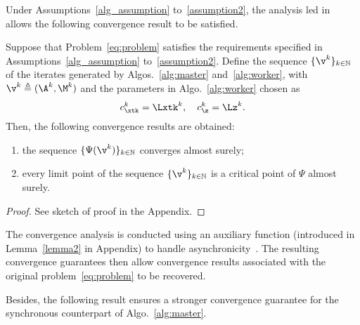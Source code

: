 \documentclass[journal,final,letterpaper,twoside,twocolumn]{IEEEtran}
\begin{document}
Under Assumptions~\ref{alg_assumption} to~\ref{assumption2}, the analysis led in~\cite{Cannelli2016} allows the following convergence result to be satisfied.

\begin{proposition} \label{prop_stochastic}
    Suppose that Problem~\eqref{eq:problem} satisfies the requirements specified in Assumptions~\ref{alg_assumption} to~\ref{assumption2}. Define the sequence $\{ \v^k \}_{k \in \mathbb{N}}$ of the iterates generated by Algos.~\ref{alg:master} and~\ref{alg:worker}, with $\v^k \triangleq (\A^k,\M^k)$ and the parameters in Algo.~\ref{alg:worker} chosen as
    \begin{equation*}
        c_{\xtk}^k = \Lxtk^k, \quad c_\z^k = \Lz^k.
    \end{equation*}
    Then, the following convergence results are obtained:
    \begin{enumerate}[label=(\roman*)]
        \item the sequence $\{ \Psi(\v^k) \}_{k \in \mathbb{N}}$ converges almost surely;
        \item every limit point of the sequence $\{ \v^k \}_{k \in \mathbb{N}}$ is a critical point of $\Psi$ almost surely.
    \end{enumerate}
\end{proposition}

\begin{proof}
See sketch of proof in the Appendix.
\end{proof}

The convergence analysis is conducted using an auxiliary function (introduced in Lemma~\ref{lemma2} in Appendix) to handle asynchronicity~\cite{Davis2016}. The resulting convergence guarantees then allow convergence results associated with the original problem~\eqref{eq:problem} to be recovered.

Besides, the following result ensures a stronger convergence guarantee for the synchronous counterpart of Algo.~\ref{alg:master}.
\end{document}
